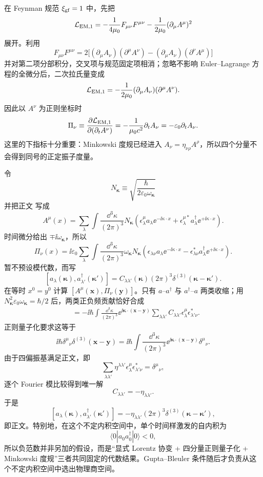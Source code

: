 \begin{derivation}[协变光子模式的对易关系]
在 Feynman 规范 $\xi_{\rm gf}=1$ 中，先把
\[
\mathcal L_{\rm EM,1}
=-\frac1{4\mu_0}F_{\mu\nu}F^{\mu\nu}
-\frac1{2\mu_0}(\partial_\mu A^\mu)^2
\]
展开。利用
\[
F_{\mu\nu}F^{\mu\nu}
=2\bigl[(\partial_\mu A_\nu)(\partial^\mu A^\nu)
-(\partial_\mu A_\nu)(\partial^\nu A^\mu)\bigr]
\]
并对第二项分部积分，交叉项与规范固定项相消；忽略不影响 Euler--Lagrange 方程的全微分后，二次拉氏量变成
\[
\mathcal L_{\rm EM,1}
=-\frac1{2\mu_0}(\partial_\mu A_\nu)(\partial^\mu A^\nu).
\]
因此以 $A^\nu$ 为正则坐标时
\[
\Pi_\nu
\equiv\frac{\partial\mathcal L_{\rm EM,1}}
{\partial(\partial_t A^\nu)}
=-\frac1{\mu_0c^2}\partial_tA_\nu
=-\varepsilon_0\partial_tA_\nu.
\]
这里的下指标十分重要：Minkowski 度规已经进入 $A_\nu=\eta_{\nu\rho}A^\rho$，所以四个分量不会得到同号的正定振子度量。

令
\[
N_{\boldsymbol\kappa}
\equiv\sqrt{\frac{\hbar}{2\varepsilon_0\omega_{\boldsymbol\kappa}}}
\]
并把正文 写成
\[
A^\mu(x)=\sum_\lambda\int\frac{\dd^3\kappa}{(2\pi)^3}N_{\boldsymbol\kappa}
\left(\epsilon_\lambda^\mu a_\lambda \ee^{-\ii\kappa\cdot x}
+\epsilon_\lambda^{\mu *}a_\lambda^\dagger \ee^{+\ii\kappa\cdot x}\right).
\]
时间微分给出 $\mp\ii\omega_{\boldsymbol\kappa}$，所以
\[
\Pi_\nu(x)=\ii\varepsilon_0\sum_\lambda\int\frac{\dd^3\kappa}{(2\pi)^3}
\omega_{\boldsymbol\kappa}N_{\boldsymbol\kappa}
\left(\epsilon_{\lambda\nu}a_\lambda \ee^{-\ii\kappa\cdot x}
-\epsilon_{\lambda\nu}^*a_\lambda^\dagger \ee^{+\ii\kappa\cdot x}\right).
\]
暂不预设模代数，而写
\[
[a_\lambda(\boldsymbol\kappa),a_{\lambda'}^\dagger(\boldsymbol\kappa')]
=C_{\lambda\lambda'}(\boldsymbol\kappa)
(2\pi)^3\delta^{(3)}(\boldsymbol\kappa-\boldsymbol\kappa').
\]
在等时 $x^0=y^0$ 计算 $[A^\mu(\mathbf x),\Pi_\nu(\mathbf y)]$。只有 $a$--$a^\dagger$ 与 $a^\dagger$--$a$ 两类收缩；用 $N_{\boldsymbol\kappa}^2\varepsilon_0\omega_{\boldsymbol\kappa}=\hbar/2$ 后，两类正负频贡献恰好合成
\begin{align*}
[A^\mu(\mathbf x),\Pi_\nu(\mathbf y)]
&=-\ii\hbar\int\frac{\dd^3\kappa}{(2\pi)^3}
 \ee^{\ii\boldsymbol\kappa\cdot(\mathbf x-\mathbf y)}
 \sum_{\lambda\lambda'}C_{\lambda\lambda'}
 \epsilon_\lambda^\mu\epsilon_{\lambda'\nu}^*.
\end{align*}
正则量子化要求这等于
\[
\ii\hbar\delta^\mu{}_{\nu}\delta^{(3)}(\mathbf x-\mathbf y)
=\ii\hbar\int\frac{\dd^3\kappa}{(2\pi)^3}
 \ee^{\ii\boldsymbol\kappa\cdot(\mathbf x-\mathbf y)}\delta^\mu{}_{\nu}.
\]
由于四偏振基满足正文，即
\[
\sum_{\lambda\lambda'}\eta^{\lambda\lambda'}
\epsilon_\lambda^\mu\epsilon_{\lambda'\nu}^*=\delta^\mu{}_{\nu},
\]
逐个 Fourier 模比较得到唯一解
\[
\boxed{C_{\lambda\lambda'}=-\eta_{\lambda\lambda'}}.
\]
于是
\[
[a_\lambda(\boldsymbol\kappa),a_{\lambda'}^\dagger(\boldsymbol\kappa')]
=-\eta_{\lambda\lambda'}(2\pi)^3\delta^{(3)}(\boldsymbol\kappa-\boldsymbol\kappa'),
\]
即正文。特别地，在这个不定内积空间中，单个时间样激发的自内积为
\[
\langle0|a_0a_0^\dagger|0\rangle<0,
\]
所以负范数并非另加的假设，而是“显式 Lorentz 协变 + 四分量正则量子化 + Minkowski 度规”三者共同固定的代数结果。Gupta--Bleuler 条件随后才负责从这个不定内积空间中选出物理商空间。
\end{derivation}

